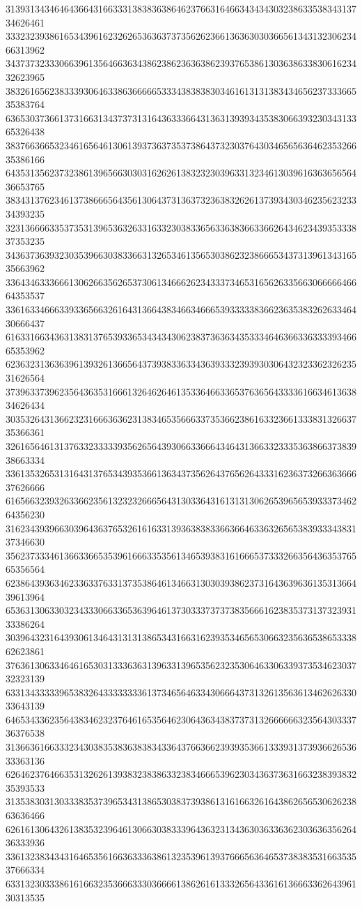 31393134346464366431663331383836386462376631646634343430323863353834313734626461
33323239386165343961623262653636373735626236613636303036656134313230623466313962
34373732333066396135646636343862386236363862393765386130363863383061623432623965
38326165623833393064633863666665333438383830346161313138343465623733366535383764
63653037366137316631343737313164363336643136313939343538306639323034313365326438
38376636653234616564613061393736373537386437323037643034656563646235326635386166
64353135623732386139656630303162626138323230396331323461303961636365656436653765
38343137623461373866656435613064373136373236383262613739343034623562323334393235
32313666633537353139653632633163323038336563363836633662643462343935333837353235
34363736393230353966303833663132653461356530386232386665343731396134316535663962
33643463336661306266356265373061346662623433373465316562633566306666646664353537
33616334666339336566326164313664383466346665393333383662363538326263346430666437
61633166343631383137653933653434343062383736363435333464636633633339346665353962
62363231363639613932613665643739383363343639333239393030643232336232623531626564
37396337396235643635316661326462646135336466336537636564333361663461363834626434
30353264313662323166636362313834653566633735366238616332366133383132663735366361
32616564613137633233333935626564393066336664346431366332333536386637383938663334
33613532653131643137653439353661363437356264376562643331623637326636366637626666
61656632393263366235613232326665643130336431613131306265396565393337346264356230
31623439396630396436376532616163313936383833663664633632656538393334383137346630
35623733346136633665353961666335356134653938316166653733326635643635376565356564
62386439363462336337633137353864613466313030393862373164363963613531366439613964
65363130633032343330663365363964613730333737373835666162383537313732393133386264
30396432316439306134643131313865343166316239353465653066323563653865333862623861
37636130633464616530313336363139633139653562323530646330633937353462303732323139
63313433333965383264333333336137346564633430666437313261356361346262633033643139
64653433623564383462323764616535646230643634383737313266666632356430333736376538
31366361663332343038353836383834336437663662393935366133393137393662653633363136
62646237646635313262613938323838633238346665396230343637363166323839383235393533
31353830313033383537396534313865303837393861316166326164386265653062623863636466
62616130643261383532396461306630383339643632313436303633636230363635626436333936
33613238343431646535616636333638613235396139376665636465373838353166353537666334
63313230333861616632353666333036666138626161333265643361613666336264396130313535
